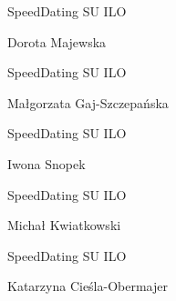 \documentclass[a4paper,12pt]{article}
\begin{document}
\begin{minipage}[c]{\textwidth}
  \hline

  \hspace{0.5cm}

  SpeedDating SU ILO

  Dorota Majewska

  \hspace{0.5cm}

  \hline
\end{minipage}



\begin{minipage}[c]{\textwidth}
  \hline

  \hspace{0.5cm}

  SpeedDating SU ILO

  Małgorzata Gaj-Szczepańska

  \hspace{0.5cm}

  \hline
\end{minipage}



\begin{minipage}[c]{\textwidth}
  \hline

  \hspace{0.5cm}

  SpeedDating SU ILO

  Iwona Snopek

  \hspace{0.5cm}

  \hline
\end{minipage}



\begin{minipage}[c]{\textwidth}
  \hline

  \hspace{0.5cm}

  SpeedDating SU ILO

  Michał Kwiatkowski

  \hspace{0.5cm}

  \hline
\end{minipage}



\begin{minipage}[c]{\textwidth}
  \hline

  \hspace{0.5cm}

  SpeedDating SU ILO

  Katarzyna Cieśla-Obermajer

  \hspace{0.5cm}

  \hline
\end{minipage}
\end{document}

